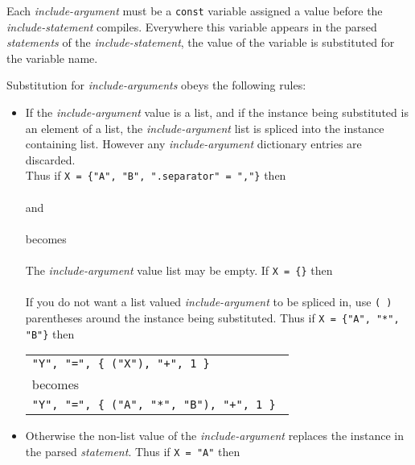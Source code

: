 \documentclass[12pt]{article}
\begin{document}
Each {\em include-argument} must be a {\tt const} variable assigned
a value before the {\em include-state\-ment} compiles.
Everywhere this variable
appears in the parsed {\em statements} of the {\em include-statement},
the value of the variable is substituted for the variable name.

Substitution for {\em include-arguments} obeys the following rules:
\begin{itemize}
\item \label{INCLUDE-SPLICING} If the {\em include-argument}
value is a list, and if the
instance being substituted is an element of a list,
the {\em include-argument} list is spliced into the instance containing
list.  However any {\em include-argument} dictionary entries are
discarded.
\\[0.5ex]
Thus if {\tt X = \{"A", "B", ".separator" = ","\}} then \\
 \\
and \\
 \\
becomes \\
 \\
The {\em include-argument} value list may be empty.
If {\tt X = \{\}} then \\
 \\
If you do not want a list valued {\em include-argument} to be spliced in,
use {\tt (~)} parentheses around the instance being substituted.
Thus if {\tt X = \{"A", "*",  "B"\}} then \\
\hspace*{2em}%
     \begin{tabular}{l}
     \tt "Y", "=", \{ ("X"), "+", 1 \} \\
     becomes \\
     \tt "Y", "=", \{ ("A", "*", "B"), "+", 1 \}
     \end{tabular}

\item Otherwise the non-list value of the {\em include-argument} replaces the
instance in the parsed {\em statement}.
Thus if {\tt X = "A"} then \\
\end{itemize}
\end{document}
